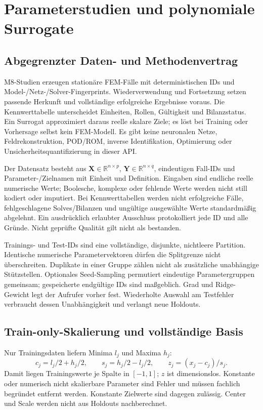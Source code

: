\chapter{Parameterstudien und polynomiale Surrogate}\label{chap:surrogates}
\section{Abgegrenzter Daten- und Methodenvertrag}
M8-Studien erzeugen stationäre FEM-Fälle mit deterministischen IDs und
Model-/Netz-/Solver-Fingerprints. Wiederverwendung und Fortsetzung setzen
passende Herkunft und vollständige erfolgreiche Ergebnisse voraus.
Die Kennwerttabelle unterscheidet Einheiten, Rollen, Gültigkeit und
Bilanzstatus. Ein Surrogat approximiert daraus reelle skalare Ziele;
es löst bei Training oder Vorhersage selbst kein FEM-Modell.
Es gibt keine neuronalen Netze, Feldrekonstruktion, POD/ROM, inverse
Identifikation, Optimierung oder Unsicherheitsquantifizierung in dieser API.

Der Datensatz besteht aus $\mathbf X\in\mathbb R^{n\times p}$,
$\mathbf Y\in\mathbb R^{n\times q}$, eindeutigen Fall-IDs und
Parameter-/Zielnamen mit Einheit und Definition. Eingaben sind endliche
reelle numerische Werte; Boolesche, komplexe oder fehlende Werte werden nicht
still kodiert oder imputiert. Bei Kennwerttabellen werden nicht erfolgreiche
Fälle, fehlgeschlagene Solves/Bilanzen und ungültige ausgewählte Werte
standardmäßig abgelehnt. Ein ausdrücklich erlaubter Ausschluss protokolliert
jede ID und alle Gründe. Nicht geprüfte Qualität gilt nicht als bestanden.

Trainings- und Test-IDs sind eine vollständige, disjunkte, nichtleere Partition.
Identische numerische Parametervektoren dürfen die Splitgrenze nicht
überschreiten. Duplikate in einer Gruppe zählen nicht als zusätzliche
unabhängige Stützstellen. Optionales Seed-Sampling permutiert eindeutige
Parametergruppen gemeinsam; gespeicherte endgültige IDs sind maßgeblich.
Grad und Ridge-Gewicht legt der Aufrufer vorher fest. Wiederholte Auswahl am
Testfehler verbraucht dessen Unabhängigkeit und verlangt neue Holdouts.

\section{Train-only-Skalierung und vollständige Basis}
Nur Trainingsdaten liefern Minima $l_j$ und Maxima $h_j$:
\begin{equation}\label{eq:surrogate-scale}
c_j=l_j/2+h_j/2,\qquad s_j=h_j/2-l_j/2,
\qquad z_j=(x_j-c_j)/s_j.
\end{equation}
Damit liegen Trainingswerte je Spalte in $[-1,1]$; $z$ ist dimensionslos.
Konstante oder numerisch nicht skalierbare Parameter sind Fehler und müssen
fachlich begründet entfernt werden. Konstante Zielwerte sind dagegen zulässig.
Center und Scale werden nicht aus Holdouts nachberechnet.


